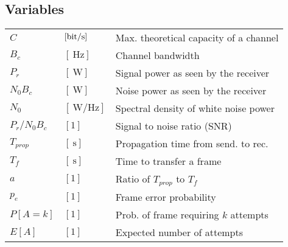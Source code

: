 \documentclass{form}
\begin{document}
\begin{center}
    \noindent%
    \begin{minipage}{0.49\textwidth}
        \section*{Variables}
        \begin{tabular}{@{}l l | p{59mm}@{}}
            $C$           & $[\SI{}{\bit/\second}     ]$ & Max. theoretical capacity of a channel                      \\
            $B_c$         & $[\SI{}{\hertz}           ]$ & Channel bandwidth                                           \\
            $P_r$         & $[\SI{}{\watt}            ]$ & Signal power as seen by the receiver                        \\
            $N_0 B_c$     & $[\SI{}{\watt}            ]$ & Noise power as seen by the receiver                         \\
            $N_0$         & $[\SI{}{\watt/\hertz}     ]$ & Spectral density of white noise power                       \\
            $P_r/N_0 B_c$ & $[1                       ]$ & Signal to noise ratio (SNR)                                 \\
            $T_{prop}$    & $[\SI{}{\second}          ]$ & Propagation time from send. to rec.                         \\
            $T_f$         & $[\SI{}{\second}          ]$ & Time to transfer a frame                                    \\
            $a$           & $[1                       ]$ & Ratio of $T_{prop}$ to $T_f$                                \\
            $p_e$         & $[1                       ]$ & Frame error probability                                     \\
            $P[A=k]$      & $[1                       ]$ & Prob. of frame requiring $k$ attempts                       \\
            $E[A]$        & $[1                       ]$ & Expected number of attempts                                 \\
        \end{tabular}
    \end{minipage}
    \begin{minipage}{0.49\textwidth}
        \begin{tabular}{l l | p{59mm}}

\end{tabular}
\end{minipage}
\end{center}
\end{document}
